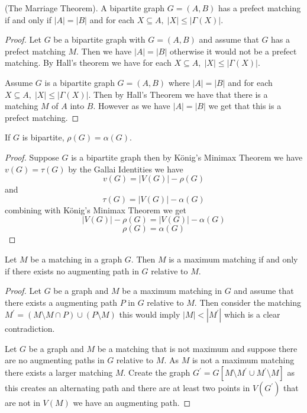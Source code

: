 \documentclass[12pt]{article}
\newenvironment{theorem}[2][Theorem]{\begin{trivlist}
\item[\hskip \labelsep {\bfseries #1}\hskip \labelsep {\bfseries #2.}]}{\end{trivlist}}
\newenvironment{corollary}[2][Corollary]{\begin{trivlist}
\item[\hskip \labelsep {\bfseries #1}\hskip \labelsep {\bfseries #2.}]}{\end{trivlist}}
\begin{document}
\begin{corollary}
    {1.1.4}(The Marriage Theorem). A bipartite graph $G=(A,B)$ has a prefect matching if and only if $|A|=|B|$ and for each $X\subseteq A,\; |X|\leq |\Gamma(X)|$.
\end{corollary}
\begin{proof}
    Let $G$ be a bipartite graph with $G=(A,B)$ and assume that $G$ has a prefect matching $M$. Then we have $|A|=|B|$ otherwise it would not be a prefect matching. By Hall's theorem we have for each $X\subseteq A,\; |X|\leq |\Gamma(X)|$.


    Assume $G$ is a bipartite graph $G=(A,B)$ where $|A|=|B|$ and for each $X \subseteq A,\; |X|\leq |\Gamma(X)|$. Then by Hall's Theorem we have that there is a matching $M$ of $A$ into $B$. However as we have $|A|=|B|$ we get that this is a prefect matching.
\end{proof}


\begin{corollary}
    {1.1.7}
    If $G$ is bipartite, $\rho(G)=\alpha(G)$.
\end{corollary}
\begin{proof}
    Suppose $G$ is a bipartite graph then by König's Minimax Theorem we have $v(G)=\tau(G)$ by the Gallai Identities we have $$v(G)=|V(G)|-\rho(G)$$ and $$\tau(G)=|V(G)|-\alpha(G)$$ combining with König's Minimax Theorem we get $$|V(G)|-\rho(G)=|V(G)|-\alpha(G)$$
    $$\rho(G)=\alpha(G)$$
\end{proof}

\begin{theorem}
    {1.2.1}
    Let $M$ be a matching in a graph $G$. Then $M$ is a maximum matching if and only if there exists no augmenting path in $G$ relative to $M$.
\end{theorem}



\begin{proof}

    Let $G$ be a graph and $M$ be a maximum matching in $G$ and assume that there exists a augmenting path $P$ in $G$ relative to $M$. Then consider the matching $M^\prime = (M \setminus M \cap P) \cup (P \setminus M)$ this would imply $|M|< |M^\prime|$ which is a clear contradiction.


    Let $G$ be a graph and $M$ be a matching that is not maximum and suppose there are no augmenting paths in $G$ relative to $M$. As $M$ is not a maximum matching there exists a larger matching $M$. Create the graph $G^\prime =G[M\setminus M^{\prime} \cup M^{\prime}\setminus M]$ as this creates an alternating path and there are at least two points in $V(G^\prime)$ that are not in $V(M)$ we have an augmenting path.
\end{proof}
\end{document}

